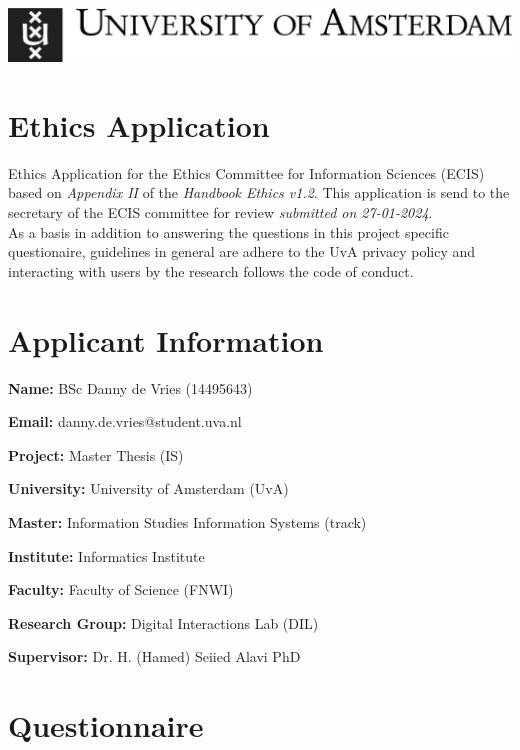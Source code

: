 \documentclass[a4paper]{article}
\begin{document}
\includegraphics[scale=0.2]{uva-logo.jpg} \\

\section*{Ethics Application}

Ethics Application for the Ethics Committee for Information Sciences (ECIS) based on \emph{Appendix II} of the \emph{Handbook Ethics v1.2}. This application is send to the secretary of the ECIS committee for review \emph{submitted on 27-01-2024}. \\

As a basis in addition to answering the questions in this project specific questionaire, guidelines in general are adhere to the UvA privacy policy and interacting with users by the research follows the code of conduct.

\section*{Applicant Information}

\begin{description}
  \item \textbf{Name:} BSc Danny de Vries (14495643)
  \item \textbf{Email:} danny.de.vries@student.uva.nl
  \item \textbf{Project:} Master Thesis (IS)
  \item \textbf{University:} University of Amsterdam (UvA)
  \item \textbf{Master:} Information Studies Information Systems (track)
  \item \textbf{Institute:} Informatics Institute
  \item \textbf{Faculty:} Faculty of Science (FNWI)
  \item \textbf{Research Group:} Digital Interactions Lab (DIL)
  \item \textbf{Supervisor:} Dr. H. (Hamed) Seiied Alavi PhD
\end{description}

\section*{Questionnaire}
\end{document}

